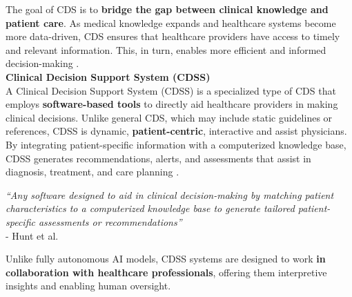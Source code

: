 \noindent The goal of CDS is to \textcolor{TUMRed}{\textbf{bridge the gap between clinical knowledge and patient care}}. As medical knowledge expands and healthcare systems become more data-driven, CDS ensures that healthcare providers have access to timely and relevant information. This, in turn, enables more efficient and informed decision-making \cite{osheroff2007roadmap}.\\[\baselineskip]

\noindent \textcolor{TUMBlue}{\textbf{Clinical Decision Support System (CDSS)}}\\
A Clinical Decision Support System (CDSS) is a specialized type of CDS that employs \textcolor{TUMRed}{\textbf{software-based tools}} to directly aid healthcare providers in making clinical decisions. Unlike general CDS, which may include static guidelines or references, CDSS is dynamic, \textcolor{TUMRed}{\textbf{patient-centric}}, interactive and assist physicians. By integrating patient-specific information with a computerized knowledge base, CDSS generates recommendations, alerts, and assessments that assist in diagnosis, treatment, and care planning \cite{hunt1998effects}.

\begin{mdframed}[backgroundcolor=black!10]
    \centering
    \textit{“Any software designed to aid in clinical decision-making by matching patient characteristics to a computerized knowledge base to generate tailored patient-specific assessments or recommendations”}\\
    \flushright
    -  Hunt et al. \cite{hunt1998effects}
\end{mdframed}

\noindent Unlike fully autonomous AI models, CDSS systems are designed to work \textcolor{TUMRed}{\textbf{in collaboration with healthcare professionals}}, offering them interpretive insights and enabling human oversight.\\[\baselineskip]

